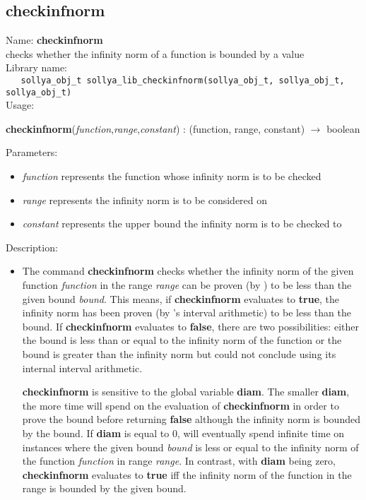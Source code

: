 \subsection{checkinfnorm}
\label{labcheckinfnorm}
\noindent Name: \textbf{checkinfnorm}\\
\phantom{aaa}checks whether the infinity norm of a function is bounded by a value\\[0.2cm]
\noindent Library name:\\
\verb|   sollya_obj_t sollya_lib_checkinfnorm(sollya_obj_t, sollya_obj_t, sollya_obj_t)|\\[0.2cm]
\noindent Usage: 
\begin{center}
\textbf{checkinfnorm}(\emph{function},\emph{range},\emph{constant}) : (\textsf{function}, \textsf{range}, \textsf{constant}) $\rightarrow$ \textsf{boolean}\\
\end{center}
Parameters: 
\begin{itemize}
\item \emph{function} represents the function whose infinity norm is to be checked
\item \emph{range} represents the infinity norm is to be considered on
\item \emph{constant} represents the upper bound the infinity norm is to be checked to
\end{itemize}
\noindent Description: \begin{itemize}

\item The command \textbf{checkinfnorm} checks whether the infinity norm of the given
   function \emph{function} in the range \emph{range} can be proven (by \sollya) to
   be less than the given bound \emph{bound}. This means, if \textbf{checkinfnorm}
   evaluates to \textbf{true}, the infinity norm has been proven (by \sollya's
   interval arithmetic) to be less than the bound. If \textbf{checkinfnorm} evaluates
   to \textbf{false}, there are two possibilities: either the bound is less than
   or equal to the infinity norm of the function or the bound is greater
   than the infinity norm but \sollya could not conclude using its
   internal interval arithmetic.
    
   \textbf{checkinfnorm} is sensitive to the global variable \textbf{diam}. The smaller \textbf{diam},
   the more time \sollya will spend on the evaluation of \textbf{checkinfnorm} in
   order to prove the bound before returning \textbf{false} although the infinity
   norm is bounded by the bound. If \textbf{diam} is equal to $0$, \sollya will
   eventually spend infinite time on instances where the given bound
   \emph{bound} is less or equal to the infinity norm of the function
   \emph{function} in range \emph{range}. In contrast, with \textbf{diam} being zero,
   \textbf{checkinfnorm} evaluates to \textbf{true} iff the infinity norm of the function in
   the range is bounded by the given bound.
\end{itemize}
